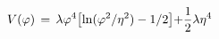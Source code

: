 \begin{equation}
V(\varphi) \, = \, \lambda \varphi^4 \bigl[{\cal{\ln}}(\varphi^2 / \eta^2)
- 1/2\bigl] + {1 \over 2} \lambda \eta^4 \,
\end{equation}

